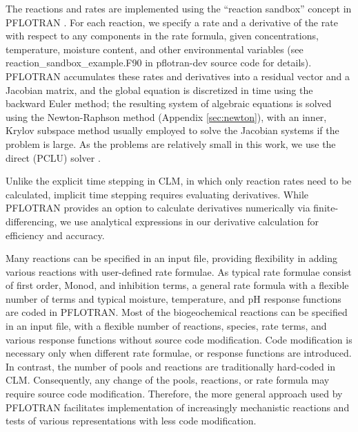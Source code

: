\documentclass[gmd, manuscript]{copernicus}
\begin{document}
The reactions and rates are implemented using the ``reaction sandbox'' concept
in PFLOTRAN \citep{Lichtner2015}. For each reaction, we specify a rate and a
derivative of the rate with respect to any components in the rate formula,
given concentrations, temperature, moisture content, and other environmental
variables (see reaction\_sandbox\_example.F90 in pflotran-dev source code for
details). PFLOTRAN accumulates these rates and derivatives into a residual
vector and a Jacobian matrix, and the global equation is discretized in time
using the backward Euler method; the resulting system of algebraic 
equations is solved using the Newton-Raphson method (Appendix \ref{sec:newton}), with an inner, Krylov subspace method usually employed to solve the Jacobian 
systems if the problem is large. As the problems are relatively small in this work, we use the direct (PCLU) solver \citep{Lichtner2015}. 

Unlike the explicit time stepping in CLM, in which only reaction rates need to be
calculated, implicit time stepping requires evaluating derivatives.  While PFLOTRAN
provides an option to calculate derivatives numerically via finite-differencing, we use analytical expressions in our 
derivative calculation for efficiency and accuracy. 

Many reactions can be specified in an input file, providing flexibility in
adding various reactions with user-defined rate formulae. As typical rate
formulae consist of first order, Monod, and inhibition terms, a general rate
formula with a flexible number of terms and typical moisture, temperature, and pH
response functions are coded in PFLOTRAN. Most of the biogeochemical reactions
can be specified in an input file, with a flexible number of reactions, species,
rate terms, and various response functions without source code modification.
Code modification is necessary only when different rate formulae, or response
functions are introduced. In contrast, the number of pools and reactions are
traditionally hard-coded in CLM. Consequently, any change of the pools,
reactions, or rate formula may require source code modification. Therefore,
the more general approach used by PFLOTRAN facilitates implementation of increasingly mechanistic
reactions and tests of various representations with less code modification.
\end{document}
